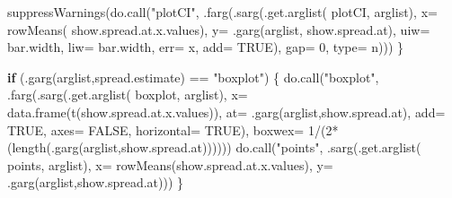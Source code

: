 \documentclass[
  letterpaper,
  DIV=11,
  numbers=noendperiod]{scrartcl}
\newenvironment{Shaded}{\begin{snugshade}}{\end{snugshade}}
\newcommand{\AttributeTok}[1]{\textcolor[rgb]{0.40,0.45,0.13}{#1}}
\newcommand{\ConstantTok}[1]{\textcolor[rgb]{0.56,0.35,0.01}{#1}}
\newcommand{\ControlFlowTok}[1]{\textcolor[rgb]{0.00,0.23,0.31}{\textbf{#1}}}
\newcommand{\DecValTok}[1]{\textcolor[rgb]{0.68,0.00,0.00}{#1}}
\newcommand{\FunctionTok}[1]{\textcolor[rgb]{0.28,0.35,0.67}{#1}}
\newcommand{\NormalTok}[1]{\textcolor[rgb]{0.00,0.23,0.31}{#1}}
\newcommand{\SpecialCharTok}[1]{\textcolor[rgb]{0.37,0.37,0.37}{#1}}
\newcommand{\StringTok}[1]{\textcolor[rgb]{0.13,0.47,0.30}{#1}}
\begin{document}
\begin{Shaded}
\begin{Highlighting}[]
        \FunctionTok{suppressWarnings}\NormalTok{(}\FunctionTok{do.call}\NormalTok{(}\StringTok{"plotCI"}\NormalTok{,}
                                 \FunctionTok{.farg}\NormalTok{(}\FunctionTok{.sarg}\NormalTok{(}\FunctionTok{.get.arglist}\NormalTok{( }\StringTok{\textquotesingle{}plotCI\textquotesingle{}}\NormalTok{, arglist),}
                                             \AttributeTok{x=} \FunctionTok{rowMeans}\NormalTok{(}
\NormalTok{                                               show.spread.at.x.values),}
                                             \AttributeTok{y=} \FunctionTok{.garg}\NormalTok{(arglist,}
                                               \StringTok{\textquotesingle{}show.spread.at\textquotesingle{}}\NormalTok{),}
                                             \AttributeTok{uiw=}\NormalTok{ bar.width,}
                                             \AttributeTok{liw=}\NormalTok{ bar.width,}
                                             \AttributeTok{err=} \StringTok{\textquotesingle{}x\textquotesingle{}}\NormalTok{,}
                                             \AttributeTok{add=} \ConstantTok{TRUE}\NormalTok{),}
                                       \AttributeTok{gap=} \DecValTok{0}\NormalTok{,}
                                       \AttributeTok{type=} \StringTok{\textquotesingle{}n\textquotesingle{}}\NormalTok{)))}
\NormalTok{    \}}
    
    \ControlFlowTok{if}\NormalTok{ (}\FunctionTok{.garg}\NormalTok{(arglist,}\StringTok{\textquotesingle{}spread.estimate\textquotesingle{}}\NormalTok{) }\SpecialCharTok{==} \StringTok{"boxplot"}\NormalTok{) \{}
        \FunctionTok{do.call}\NormalTok{(}\StringTok{"boxplot"}\NormalTok{,}
                \FunctionTok{.farg}\NormalTok{(}\FunctionTok{.sarg}\NormalTok{(}\FunctionTok{.get.arglist}\NormalTok{( }\StringTok{\textquotesingle{}boxplot\textquotesingle{}}\NormalTok{, arglist),}
                            \AttributeTok{x=} \FunctionTok{data.frame}\NormalTok{(}\FunctionTok{t}\NormalTok{(show.spread.at.x.values)),}
                            \AttributeTok{at=} \FunctionTok{.garg}\NormalTok{(arglist,}\StringTok{\textquotesingle{}show.spread.at\textquotesingle{}}\NormalTok{),}
                            \AttributeTok{add=} \ConstantTok{TRUE}\NormalTok{,}
                            \AttributeTok{axes=} \ConstantTok{FALSE}\NormalTok{,}
                            \AttributeTok{horizontal=} \ConstantTok{TRUE}\NormalTok{),}
                      \AttributeTok{boxwex=} \DecValTok{1}\SpecialCharTok{/}\NormalTok{(}\DecValTok{2}\SpecialCharTok{*}\NormalTok{(}\FunctionTok{length}\NormalTok{(}\FunctionTok{.garg}\NormalTok{(arglist,}\StringTok{\textquotesingle{}show.spread.at\textquotesingle{}}\NormalTok{))))))}
        \FunctionTok{do.call}\NormalTok{(}\StringTok{"points"}\NormalTok{, }\FunctionTok{.sarg}\NormalTok{(}\FunctionTok{.get.arglist}\NormalTok{( }\StringTok{\textquotesingle{}points\textquotesingle{}}\NormalTok{, arglist),}
                                \AttributeTok{x=} \FunctionTok{rowMeans}\NormalTok{(show.spread.at.x.values),}
                                \AttributeTok{y=} \FunctionTok{.garg}\NormalTok{(arglist,}\StringTok{\textquotesingle{}show.spread.at\textquotesingle{}}\NormalTok{)))}
\NormalTok{    \}}
    

\end{Highlighting}
\end{Shaded}
\end{document}
